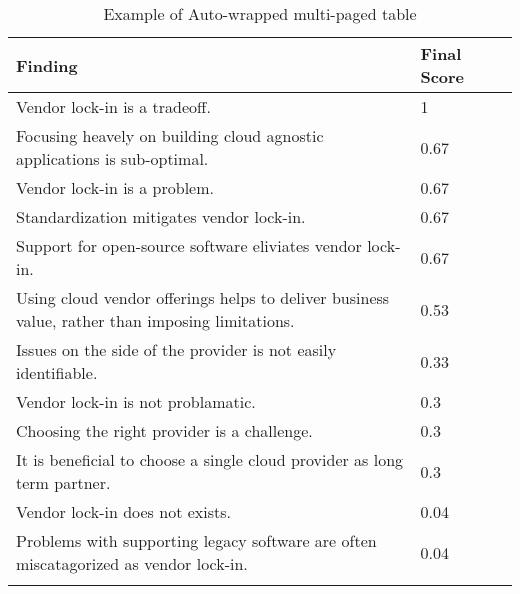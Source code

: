 
\renewcommand\arraystretch{1.5}%
\begin{longtable}{|p{10cm}|p{2cm}|p{2cm}|}
\hline
\textbf{Finding} & \textbf{Final Score} \\ \hline
\endhead
Vendor lock-in is a tradeoff. & 1 \\ \hline
Focusing heavely on building cloud agnostic applications is sub-optimal. & 0.67 \\ \hline
Vendor lock-in is a problem. & 0.67 \\ \hline
Standardization mitigates vendor lock-in. & 0.67 \\ \hline
Support for open-source software eliviates vendor lock-in. & 0.67 \\ \hline
Using cloud vendor offerings helps to deliver business value, rather than imposing limitations. & 0.53 \\ \hline
Issues on the side of the provider is not easily identifiable. & 0.33 \\ \hline
Vendor lock-in is not problamatic. & 0.3 \\ \hline
Choosing the right provider is a challenge. & 0.3 \\ \hline
It is beneficial to choose a single cloud provider as long term partner. & 0.3 \\ \hline
Vendor lock-in does not exists. & 0.04 \\ \hline
Problems with supporting legacy software are often miscatagorized as vendor lock-in. & 0.04 \\ \hline
\caption{Example of Auto-wrapped multi-paged table}
\label{tab:table1}
\end{longtable}
